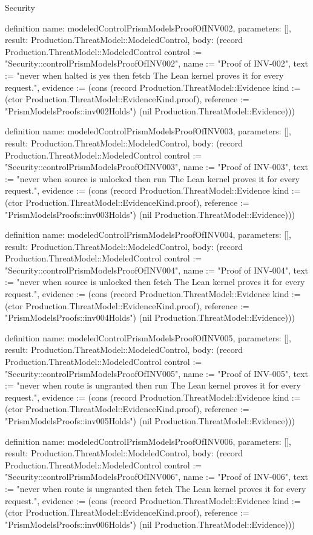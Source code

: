 \begin{lexlean}{Security}
\begin{semanticmodule}
definition{
  name: modeledControlPrismModelsProofOfINV002,
  parameters: [],
  result: Production.ThreatModel::ModeledControl,
  body: (record Production.ThreatModel::ModeledControl {control := "Security::controlPrismModelsProofOfINV002", name := "Proof of INV-002", text := "never when halted is yes then fetch The Lean kernel proves it for every request.", evidence := (cons (record Production.ThreatModel::Evidence {kind := (ctor Production.ThreatModel::EvidenceKind.proof), reference := "PrismModelsProofs::inv002Holds"}) (nil Production.ThreatModel::Evidence))})
}

definition{
  name: modeledControlPrismModelsProofOfINV003,
  parameters: [],
  result: Production.ThreatModel::ModeledControl,
  body: (record Production.ThreatModel::ModeledControl {control := "Security::controlPrismModelsProofOfINV003", name := "Proof of INV-003", text := "never when source is unlocked then run The Lean kernel proves it for every request.", evidence := (cons (record Production.ThreatModel::Evidence {kind := (ctor Production.ThreatModel::EvidenceKind.proof), reference := "PrismModelsProofs::inv003Holds"}) (nil Production.ThreatModel::Evidence))})
}

definition{
  name: modeledControlPrismModelsProofOfINV004,
  parameters: [],
  result: Production.ThreatModel::ModeledControl,
  body: (record Production.ThreatModel::ModeledControl {control := "Security::controlPrismModelsProofOfINV004", name := "Proof of INV-004", text := "never when source is unlocked then fetch The Lean kernel proves it for every request.", evidence := (cons (record Production.ThreatModel::Evidence {kind := (ctor Production.ThreatModel::EvidenceKind.proof), reference := "PrismModelsProofs::inv004Holds"}) (nil Production.ThreatModel::Evidence))})
}

definition{
  name: modeledControlPrismModelsProofOfINV005,
  parameters: [],
  result: Production.ThreatModel::ModeledControl,
  body: (record Production.ThreatModel::ModeledControl {control := "Security::controlPrismModelsProofOfINV005", name := "Proof of INV-005", text := "never when route is ungranted then run The Lean kernel proves it for every request.", evidence := (cons (record Production.ThreatModel::Evidence {kind := (ctor Production.ThreatModel::EvidenceKind.proof), reference := "PrismModelsProofs::inv005Holds"}) (nil Production.ThreatModel::Evidence))})
}

definition{
  name: modeledControlPrismModelsProofOfINV006,
  parameters: [],
  result: Production.ThreatModel::ModeledControl,
  body: (record Production.ThreatModel::ModeledControl {control := "Security::controlPrismModelsProofOfINV006", name := "Proof of INV-006", text := "never when route is ungranted then fetch The Lean kernel proves it for every request.", evidence := (cons (record Production.ThreatModel::Evidence {kind := (ctor Production.ThreatModel::EvidenceKind.proof), reference := "PrismModelsProofs::inv006Holds"}) (nil Production.ThreatModel::Evidence))})
}


\end{semanticmodule}
\end{lexlean}
